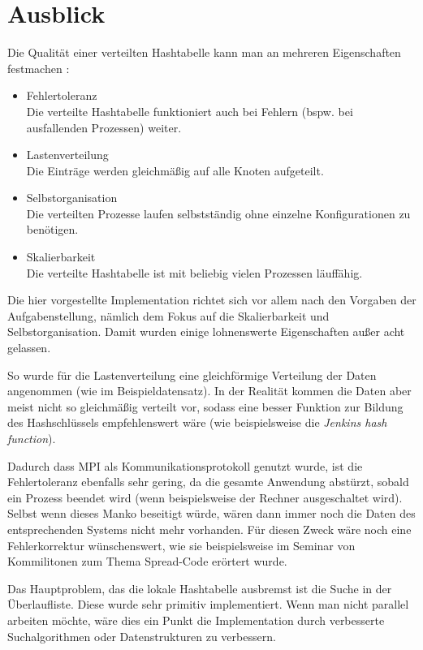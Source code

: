 \documentclass{scrreprt}
\begin{document}
\section{Ausblick}
Die Qualität einer verteilten Hashtabelle kann man an mehreren Eigenschaften festmachen%
:
\begin{itemize}
\item Fehlertoleranz\\
Die verteilte Hashtabelle funktioniert auch bei Fehlern (bspw. bei ausfallenden Prozessen) weiter.
\item Lastenverteilung\\
Die Einträge werden gleichmäßig auf alle Knoten aufgeteilt.
\item Selbstorganisation\\
Die verteilten Prozesse laufen selbstständig ohne einzelne Konfigurationen zu benötigen.
\item Skalierbarkeit\\
Die verteilte Hashtabelle ist mit beliebig vielen Prozessen läuffähig.
\end{itemize}

Die hier vorgestellte Implementation richtet sich vor allem nach den Vorgaben der Aufgabenstellung, nämlich dem Fokus auf die Skalierbarkeit und Selbstorganisation. Damit wurden einige lohnenswerte Eigenschaften außer acht gelassen. 

So wurde für die Lastenverteilung eine gleichförmige Verteilung der Daten angenommen (wie im Beispieldatensatz). In der Realität kommen die Daten aber meist nicht so gleichmäßig verteilt vor, sodass eine besser Funktion zur Bildung des Hashschlüssels empfehlenswert wäre (wie beispielsweise die \emph{Jenkins hash function}).

Dadurch dass MPI als Kommunikationsprotokoll genutzt wurde, ist die Fehlertoleranz ebenfalls sehr gering, da die gesamte Anwendung abstürzt, sobald ein Prozess beendet wird (wenn beispielsweise der Rechner ausgeschaltet wird). Selbst wenn dieses Manko beseitigt würde, wären dann immer noch die Daten des entsprechenden Systems nicht mehr vorhanden. Für diesen Zweck wäre noch eine Fehlerkorrektur wünschenswert, wie sie beispielsweise im Seminar von Kommilitonen zum Thema Spread-Code erörtert wurde.

Das Hauptproblem, das die lokale Hashtabelle ausbremst ist die Suche in der Überlaufliste. Diese wurde sehr primitiv implementiert. Wenn man nicht parallel arbeiten möchte, wäre dies ein Punkt die Implementation durch verbesserte Suchalgorithmen oder Datenstrukturen zu verbessern. 
\end{document}
